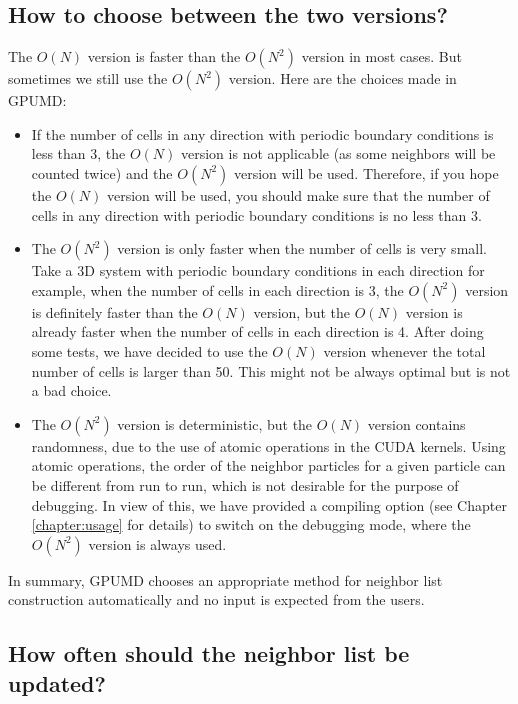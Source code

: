 \documentclass[12pt,a4paper]{report}
\begin{document}
\subsection{How to choose between the two versions?}

The $O(N)$ version is faster than the $O(N^2)$ version in most cases. But sometimes we still use the $O(N^2)$ version. Here are the choices made in GPUMD:
\begin{itemize}
\item If the number of cells in any direction with periodic boundary conditions is less than 3, the $O(N)$ version is not applicable (as some neighbors will be counted twice) and the $O(N^2)$ version will be used. Therefore, if you hope the $O(N)$ version will be used, you should make sure that the number of cells in any direction with periodic boundary conditions is no less than 3.
\item The $O(N^2)$ version is only faster when the number of cells is very small. Take a 3D system with periodic boundary conditions in each direction for example, when the number of cells in each direction is 3, the $O(N^2)$ version is definitely faster than the $O(N)$ version, but the $O(N)$ version is already faster when the number of cells in each direction is 4. After doing some tests, we have decided to use the $O(N)$ version whenever the total number of cells is larger than 50. This might not be always optimal but is not a bad choice.
\item The $O(N^2)$ version is deterministic, but the $O(N)$ version contains randomness, due to the use of atomic operations in the CUDA kernels. Using atomic operations, the order of the neighbor particles for a given particle can be different from run to run, which is not desirable for the purpose of debugging. In view of this, we have provided a compiling option (see Chapter \ref{chapter:usage} for details) to switch on the debugging mode, where the $O(N^2)$ version is always used.
\end{itemize}
In summary, GPUMD chooses an appropriate method for neighbor list construction automatically and no input is expected from the users.


\subsection{How often should the neighbor list be updated?}
\end{document}
